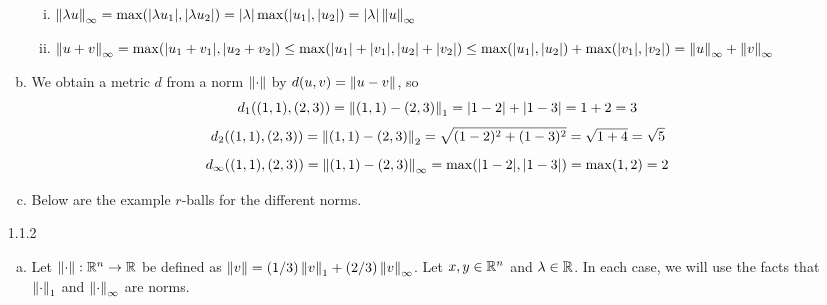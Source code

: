 \documentclass[../../Solutions.tex]{subfiles}
\begin{document}
\begin{itemize}
\begin{enumerate}[(a)]
\begin{enumerate}[(i)]
					\item $\left\lVert\lambda u\right\rVert_\infty = \max(|\lambda u_1|,|\lambda u_2|) = |\lambda|\max(|u_1|,|u_2|) = |\lambda|\left\lVert u\right\rVert_\infty$
					\item $\left\lVert u+v\right\rVert_\infty = \max(|u_1+v_1|,|u_2+v_2|) \leq \max(|u_1|+|v_1|,|u_2|+|v_2|) \leq \max(|u_1|,|u_2|)+\max(|v_1|,|v_2|) = \left\lVert u\right\rVert_\infty+\left\lVert v\right\rVert_\infty$
				\end{enumerate}
			\item We obtain a metric $d$ from a norm $\left\lVert\cdot\right\rVert$ by $d(u,v) = \left\lVert u-v\right\rVert$, so
				$$ d_1((1,1),(2,3)) = \left\lVert(1,1)-(2,3)\right\rVert_1 = |1-2|+|1-3| = 1+2 = 3 $$
				$$ d_2((1,1),(2,3)) = \left\lVert(1,1)-(2,3)\right\rVert_2 = \sqrt{(1-2)^2+(1-3)^2} = \sqrt{1+4} = \sqrt{5} $$
				$$ d_\infty((1,1),(2,3)) = \left\lVert(1,1)-(2,3)\right\rVert_\infty = \max(|1-2|,|1-3|) = \max(1,2) = 2 $$
			\item Below are the example $r$-balls for the different norms.
			\begin{figure}[h]
				\begin{center}
					
				\end{center}
			\end{figure}
		\end{enumerate}
	
	\item [1.1.2]
		\begin{enumerate}[(a)]
			\item Let $\left\lVert\cdot\right\rVert:\mathbb{R}^n \to \mathbb{R}$ be defined as $\left\lVert v\right\rVert = (1/3)\left\lVert v\right\rVert_1+(2/3)\left\lVert v\right\rVert_\infty$.
				Let $x,y \in \mathbb{R}^n$ and $\lambda \in \mathbb{R}$.
				In each case, we will use the facts that $\left\lVert\cdot\right\rVert_1$ and $\left\lVert\cdot\right\rVert_\infty$ are norms.
				

\end{enumerate}
\end{itemize}
\end{document}
